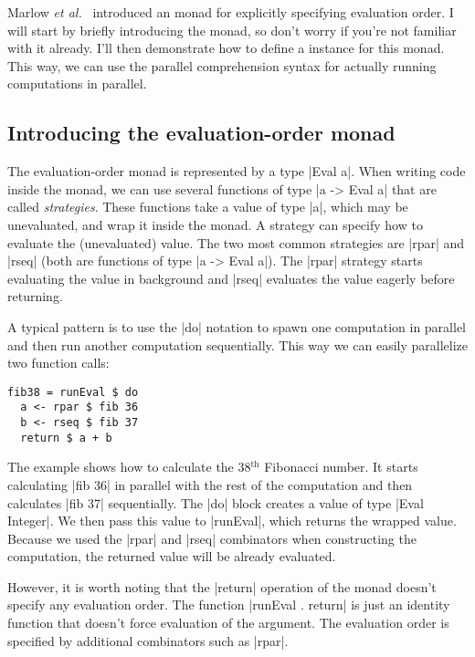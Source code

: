 \documentclass{tmr}
\renewcommand{\th}{\ensuremath{{}^\text{th}}}
\newcommand{\etal}{\textit{et al.}}
\begin{document}
Marlow \etal\ \cite{strategies-new} introduced an  monad for explicitly 
specifying evaluation order. I will start by briefly introducing the monad, so don't 
worry if you're not familiar with it already. I'll then demonstrate how to define a 
 instance for this monad. This way, we can use the parallel 
comprehension syntax for actually running computations in parallel.


\subsection{Introducing the evaluation-order monad}

The evaluation-order monad is represented by a type |Eval a|. When writing code inside the monad,
we can use several functions of type |a -> Eval a| that are called \textit{strategies}. These
functions take a value of type |a|, which may be unevaluated, and wrap it inside the monad.
A strategy can specify how to evaluate the (unevaluated) value. The two most common strategies
are |rpar| and |rseq| (both are functions of type |a -> Eval a|). The |rpar| strategy starts 
evaluating the value in background and |rseq| evaluates the value eagerly before returning. 

A typical pattern is to use the |do| notation to spawn one computation in parallel and then 
run another computation sequentially. This way we can easily parallelize two function calls:

\begin{verbatim}
fib38 = runEval $ do 
  a <- rpar $ fib 36
  b <- rseq $ fib 37
  return $ a + b
\end{verbatim}
The example shows how to calculate the $38\th$ Fibonacci number. It starts calculating 
|fib 36| in parallel with the rest of the computation and then calculates |fib 37| sequentially.
The |do| block creates a value of type |Eval Integer|. We then pass
this value to |runEval|, 
which returns the wrapped value. Because we used the |rpar| and |rseq| combinators when constructing 
the computation, the returned value will be already evaluated.

However, it is worth noting that the |return| operation of the monad doesn't specify any evaluation 
order. The function |runEval . return| is just an identity function that doesn't force evaluation 
of the argument. The evaluation order is specified by additional combinators such as |rpar|.
\end{document}
